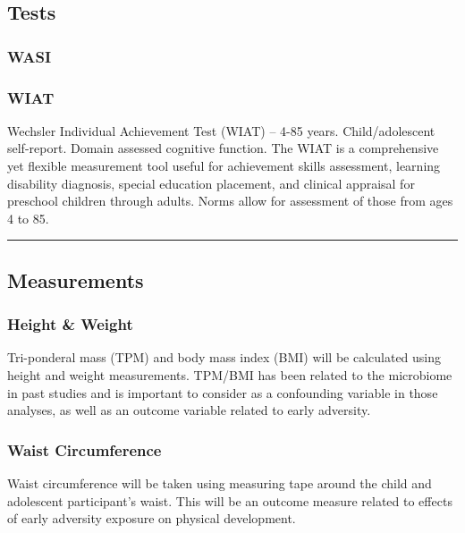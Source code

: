 \documentclass[
]{book}
\begin{document}
\hypertarget{tests}{%
\subsection{Tests}\label{tests}}

\hypertarget{wasi}{%
\subsubsection{WASI}\label{wasi}}

\hypertarget{wiat}{%
\subsubsection{WIAT}\label{wiat}}

Wechsler Individual Achievement Test (WIAT) -- 4-85 years. Child/adolescent self-report. Domain assessed cognitive function. The WIAT is a comprehensive yet flexible measurement tool useful for achievement skills assessment, learning disability diagnosis, special education placement, and clinical appraisal for preschool children through adults. Norms allow for assessment of those from ages 4 to 85.

\begin{center}\rule{0.5\linewidth}{0.5pt}\end{center}

\hypertarget{measurements}{%
\subsection{Measurements}\label{measurements}}

\hypertarget{height-weight}{%
\subsubsection{Height \& Weight}\label{height-weight}}

Tri-ponderal mass (TPM) and body mass index (BMI) will be calculated using height and weight measurements. TPM/BMI has been related to the microbiome in past studies and is important to consider as a confounding variable in those analyses, as well as an outcome variable related to early adversity.

\hypertarget{waist-circumference}{%
\subsubsection{Waist Circumference}\label{waist-circumference}}

Waist circumference will be taken using measuring tape around the child and adolescent participant's waist. This will be an outcome measure related to effects of early adversity exposure on physical development.
\end{document}
